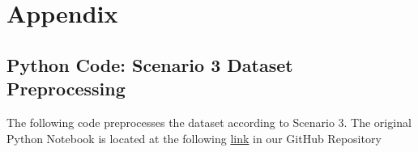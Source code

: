 \documentclass[10pt,twocolumn,letterpaper]{article}
\begin{document}


{\small


}

\clearpage %
\onecolumn %

\section{Appendix}
\label{sec:appendix}

\subsection{Python Code: Scenario 3 Dataset Preprocessing}

The following code preprocesses the dataset according to Scenario 3.
The original Python Notebook is located at the following \href{https://colab.research.google.com/github/TannerAGraves/GPT-LieDetection/blob/main/dataset/datasets.ipynb}{link} in our GitHub Repository
\end{document}
